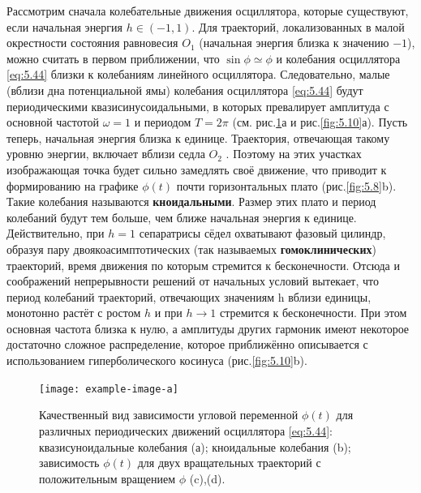 Рассмотрим сначала колебательные движения осциллятора, которые
существуют, если начальная энергия $h \in (-1,1)$. Для траекторий, локализованных
в малой окрестности состояния равновесия $O_1$ (начальная энергия близка к
значению $-1$), можно считать в первом приближении, что $\sin \phi \simeq \phi$ и колебания
осциллятора \eqref{eq:5.44} близки к колебаниям линейного осциллятора.
Следовательно, малые (вблизи дна потенциальной ямы) колебания осциллятора
\eqref{eq:5.44} будут периодическими квазисинусоидальными, в которых превалирует
амплитуда с основной частотой $\omega=1$ и периодом $T = 2 \pi$ (см. рис.\ref{fig:5.9}а и рис.\ref{fig:5.10}а).
Пусть теперь, начальная энергия близка к единице. Траектория, отвечающая
такому уровню энергии, включает вблизи седла $O_2$ . Поэтому на этих участках
изображающая точка будет сильно замедлять своё движение, что приводит к
формированию на графике $\phi(t)$ почти горизонтальных плато (рис.\ref{fig:5.8}b). Такие
колебания называются \textbf{кноидальными}. Размер этих плато и период колебаний 
будут тем больше, чем ближе начальная энергия к единице. Действительно, при
$h=1$ сепаратрисы сёдел охватывают фазовый цилиндр, образуя пару
двоякоасимптотических (так называемых \textbf{гомоклинических}) траекторий, время
движения по которым стремится к бесконечности. Отсюда и соображений
непрерывности решений от начальных условий вытекает, что период колебаний
траекторий, отвечающих значениям h вблизи единицы, монотонно растёт с
ростом $h$ и при $h \to 1$ стремится к бесконечности. При этом основная частота
близка к нулю, а амплитуды других гармоник имеют некоторое достаточно
сложное распределение, которое приближённо описывается с использованием
гиперболического косинуса (рис.\ref{fig:5.10}b).
\begin{figure}[h]
        \centering
        \texttt{[image: example-image-a]}
        \caption{Качественный вид зависимости угловой переменной $\phi(t)$ для различных периодических движений осциллятора \eqref{eq:5.44}: квазисуноидальные колебания (а); кноидальные колебания (b); зависимость $\phi(t)$ для двух вращательных траекторий с положительным вращением $\phi$ (c),(d).}
        \label{fig:5.9}
\end{figure}

